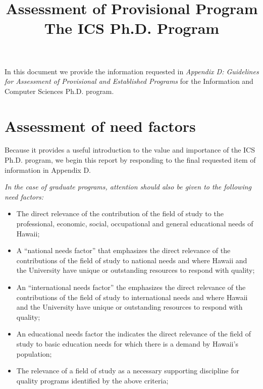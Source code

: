 \documentclass[12pt]{article}
\begin{document}
\title{ Assessment of Provisional Program\\
        {\bf The ICS Ph.D. Program}}

\maketitle

\tableofcontents

\newpage

In this document we provide the information requested in {\em Appendix D:
Guidelines for Assessment of Provisional and Established Programs} for the
Information and Computer Sciences Ph.D. program.

\section{Assessment of need factors}

Because it provides a useful introduction to the value and importance of the ICS
Ph.D. program, we begin this report by responding to the final requested
item of information in Appendix D.

{\em
\medskip \noindent In the case of graduate programs, attention should also be given to the
following need factors:
\begin{itemize}
\item The direct relevance of the contribution of the field of study to the
  professional, economic, social, occupational and general educational
  needs of Hawaii; 
\item A ``national needs factor'' that emphasizes the direct relevance of
  the contributions of the field of study to national needs and where
  Hawaii and the University have unique or outstanding resources to
  respond with quality;
\item An ``international needs factor'' the emphasizes the direct relevance of
  the contributions of the field of study to international needs and where
  Hawaii and the University have unique or outstanding resources to
  respond with quality;
\item An educational needs factor the indicates the direct relevance of the
  field of study to basic education needs for which there is a demand by
  Hawaii's population;
\item The relevance of a field of study as a necessary supporting
  discipline for quality programs identified by the above criteria;
\end{itemize}
}
\end{document}
